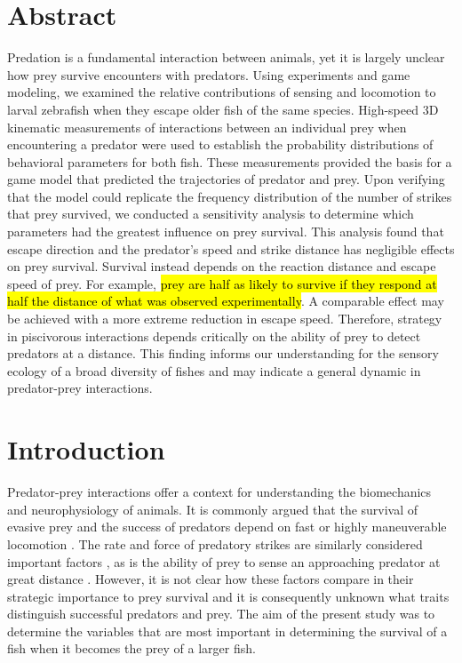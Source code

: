 \documentclass[]{rsos}%
\begin{document}
\section*{Abstract}
Predation is a fundamental interaction between animals, yet it is largely unclear how prey survive encounters with predators.
Using experiments and game modeling, we examined the relative contributions of sensing and locomotion to larval zebrafish when they escape older fish of the same species.
High-speed 3D kinematic measurements of interactions between an individual prey when encountering a predator were used to establish the probability distributions of behavioral parameters for both fish.
These measurements provided the basis for a game model that predicted the trajectories of predator and prey. 
Upon verifying that the model could replicate the frequency distribution of the number of strikes that prey survived, we conducted a sensitivity analysis to determine which parameters had the greatest influence on prey survival.
This analysis found that escape direction and the predator's speed and strike distance has negligible effects on prey survival.
Survival instead depends on the reaction distance and escape speed of prey. 
For example, \hl{prey are half as likely to survive if they respond at half the distance of what was observed experimentally}.
A comparable effect may be achieved with a more extreme reduction in escape speed. 
Therefore, strategy in piscivorous interactions depends critically on the ability of prey to detect predators at a distance.
This finding informs our understanding for the sensory ecology of a broad diversity of fishes and may indicate a general dynamic in predator-prey interactions.


\section{Introduction}

Predator-prey interactions offer a context for understanding the biomechanics and neurophysiology of animals.
It is commonly argued that the survival of evasive prey and the success of predators depend on fast or highly maneuverable locomotion \cite{Alexander:BbR35qCj, Wilson:2013fda, Walker:2005vn}.
The rate and force of predatory strikes are similarly considered important factors \cite{deVries:2012tc, Holzman:2009uu}, as is the ability of prey to sense an approaching predator at great distance \cite{Dill:1972wh, Gabbiani:1999wz}.
However, it is not clear how these factors compare in their strategic importance to prey survival and it is consequently unknown what traits distinguish successful predators and prey. 
The aim of the present study was to determine the variables that are most important in determining the survival of a fish when it becomes the prey of a larger fish.
\end{document}
